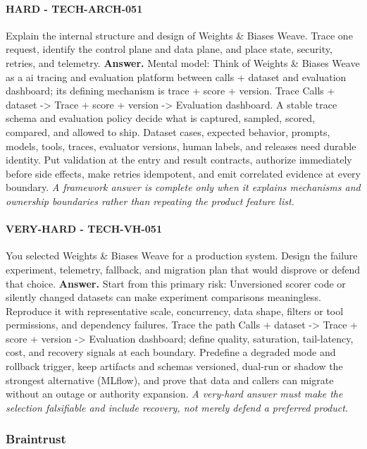 \paragraph{HARD - TECH-ARCH-051} Explain the internal structure and design of Weights \& Biases Weave. Trace one request, identify the control plane and data plane, and place state, security, retries, and telemetry.
\textbf{Answer.} Mental model: Think of Weights \& Biases Weave as a ai tracing and evaluation platform between calls + dataset and evaluation dashboard; its defining mechanism is trace + score + version. Trace Calls + dataset -> Trace + score + version -> Evaluation dashboard. A stable trace schema and evaluation policy decide what is captured, sampled, scored, compared, and allowed to ship. Dataset cases, expected behavior, prompts, models, tools, traces, evaluator versions, human labels, and releases need durable identity. Put validation at the entry and result contracts, authorize immediately before side effects, make retries idempotent, and emit correlated evidence at every boundary.
\textit{A framework answer is complete only when it explains mechanisms and ownership boundaries rather than repeating the product feature list.}
\paragraph{VERY-HARD - TECH-VH-051} You selected Weights \& Biases Weave for a production system. Design the failure experiment, telemetry, fallback, and migration plan that would disprove or defend that choice.
\textbf{Answer.} Start from this primary risk: Unversioned scorer code or silently changed datasets can make experiment comparisons meaningless. Reproduce it with representative scale, concurrency, data shape, filters or tool permissions, and dependency failures. Trace the path Calls + dataset -> Trace + score + version -> Evaluation dashboard; define quality, saturation, tail-latency, cost, and recovery signals at each boundary. Predefine a degraded mode and rollback trigger, keep artifacts and schemas versioned, dual-run or shadow the strongest alternative (MLflow), and prove that data and callers can migrate without an outage or authority expansion.
\textit{A very-hard answer must make the selection falsifiable and include recovery, not merely defend a preferred product.}
\subsubsection*{Braintrust}

